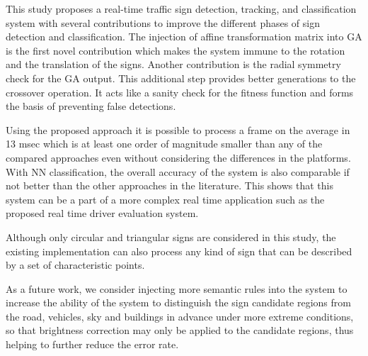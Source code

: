 \documentclass[review,number]{elsarticle}
\begin{document}
This study proposes a real-time traffic sign detection, tracking, and classification system with several contributions to improve the different phases of sign detection and classification. The injection of affine transformation matrix into GA is the first novel contribution which makes the system immune to the rotation and the translation of the signs. Another contribution is the radial symmetry check for the GA output. This additional step provides better generations to the crossover operation. It acts like a sanity check for the fitness function and forms the basis of preventing false detections.

Using the proposed approach it is possible to process a frame on the average in 13 msec which is at least one order of magnitude smaller than any of the compared approaches even without considering the differences in the platforms. With NN classification, the overall accuracy of the system is also comparable if not better than the other approaches in the literature.  This shows that this system can be a part of a more complex real time application such as the proposed real time driver evaluation system.

Although only circular and triangular signs are considered in this study, the existing implementation can also process any kind of sign that can be described by a set of characteristic points. 

As a future work, we consider injecting more semantic rules into the system to increase the ability of the system to distinguish the sign candidate regions from the road, vehicles, sky and buildings in advance under more extreme conditions, so that brightness correction may only be applied to the candidate regions, thus helping to further reduce the error rate.




\end{document}
